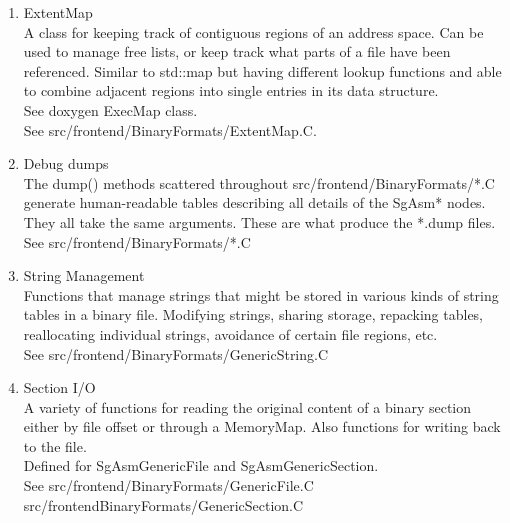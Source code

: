 \begin{enumerate}
\begin{enumerate}
      \item {\bf std::string Rose::getFileNameWithoutPath ( SgStatement* statementPointer );} \\
      Returns the name of file associated the specific statement of the AST. The returned
      string excludes the files path.

      \item {\bf std::string Rose::getFileName ( SgLocatedNode* locatedNodePointer );} \\
      Returns the name of file associated the specific statement or expression of the AST.
      The returned string is the absolute path plus file name.
   \end{enumerate}

   \item ExtentMap \\
   A class for keeping track of contiguous regions of an address
   space. Can be used to manage free lists, or keep track what
   parts of a file have been referenced. Similar to std::map but
   having different lookup functions and able to combine adjacent
   regions into single entries in its data structure. \\
   See doxygen ExecMap class. \\
   See src/frontend/BinaryFormats/ExtentMap.C.

   \item Debug dumps \\
   The dump() methods scattered throughout
   src/frontend/BinaryFormats/*.C generate human-readable tables
   describing all details of the SgAsm* nodes. They all take the
   same arguments. These are what produce the *.dump files. \\
   See src/frontend/BinaryFormats/*.C

   \item String Management \\
   Functions that manage strings that might be stored in various
   kinds of string tables in a binary file.  Modifying strings,
   sharing storage, repacking tables, reallocating individual
   strings, avoidance of certain file regions, etc. \\
   See src/frontend/BinaryFormats/GenericString.C

   \item Section I/O \\
   A variety of functions for reading the original content of a
   binary section either by file offset or through a
   MemoryMap. Also functions for writing back to the file. \\
   Defined for SgAsmGenericFile and SgAsmGenericSection. \\
   See src/frontend/BinaryFormats/GenericFile.C src/frontendBinaryFormats/GenericSection.C


\end{enumerate}
